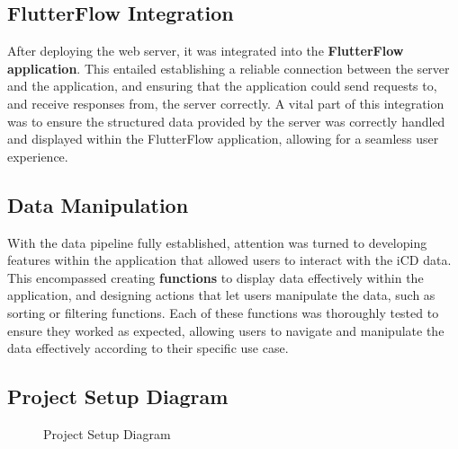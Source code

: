 \subsection{FlutterFlow Integration}
After deploying the web server, it was integrated into the {\color{limeGreen}\textbf{FlutterFlow application}}. 
This entailed establishing a reliable connection between the server and the application, and ensuring that the application could send requests to, and receive responses from, the server correctly. 
A vital part of this integration was to ensure the structured data provided by the server was correctly handled and displayed within the FlutterFlow application, allowing for a seamless user experience.

\subsection{Data Manipulation}

With the data pipeline fully established, attention was turned to developing features within the application that allowed users to interact with the iCD data. 
This encompassed creating {\color{limeGreen}\textbf{functions}} to display data effectively within the application, and designing actions that let users manipulate the data, such as sorting or filtering functions. 
Each of these functions was thoroughly tested to ensure they worked as expected, allowing users to navigate and manipulate the data effectively according to their specific use case.

\subsection{Project Setup Diagram}
\begin{figure}[H]
    \centering
    \caption{ Project Setup Diagram }
    \label{fig: Project_Setup_Diagram}
\end{figure}
